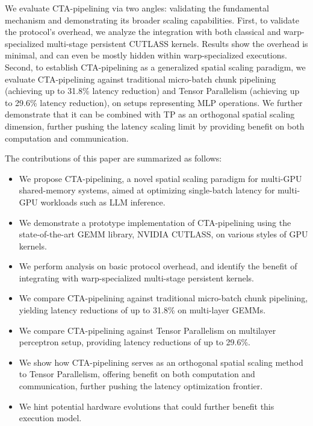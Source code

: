 We evaluate CTA-pipelining via two angles: validating the fundamental mechanism and demonstrating its broader scaling capabilities. First, to validate the protocol's overhead, we analyze the integration with both classical and warp-specialized multi-stage persistent CUTLASS kernels. Results show the overhead is minimal, and can even be mostly hidden within warp-specialized executions. Second, to establish CTA-pipelining as a generalized spatial scaling paradigm, we evaluate CTA-pipelining against traditional micro-batch chunk pipelining (achieving up to 31.8\% latency reduction) and Tensor Parallelism (achieving up to 29.6\% latency reduction), on setups representing MLP operations. We further demonstrate that it can be combined with TP as an orthogonal spatial scaling dimension, further pushing the latency scaling limit by providing benefit on both computation and communication.

The contributions of this paper are summarized as follows:
\begin{itemize}
    \item We propose CTA-pipelining, a novel spatial scaling paradigm for multi-GPU shared-memory systems, aimed at optimizing single-batch latency for multi-GPU workloads such as LLM inference.
    \item We demonstrate a prototype implementation of CTA-pipelining using the state-of-the-art GEMM library, NVIDIA CUTLASS, on various styles of GPU kernels.
    \item We perform analysis on basic protocol overhead, and identify the benefit of integrating with warp-specialized multi-stage persistent kernels.
    \item We compare CTA-pipelining against traditional micro-batch chunk pipelining, yielding latency reductions of up to 31.8\% on multi-layer GEMMs. 
    \item We compare CTA-pipelining against Tensor Parallelism on multilayer perceptron setup, providing latency reductions of up to 29.6\%. 
    \item We show how CTA-pipelining serves as an orthogonal spatial scaling method to Tensor Parallelism, offering benefit on both computation and communication, further pushing the latency optimization frontier. 
    \item We hint potential hardware evolutions that could further benefit this execution model.
\end{itemize}

